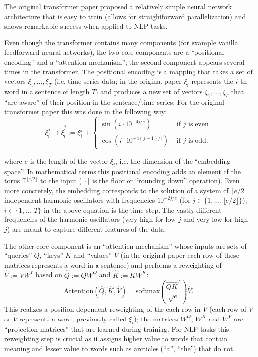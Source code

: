 \documentclass{article}
\begin{document}
The original transformer paper \cite{vaswani2017attention} proposed a relatively simple neural network architecture that is easy to train (allows for straightforward parallelization) and shows remarkable success when applied to NLP tasks. 

Even though the transformer contains many components (for example vanilla feedforward neural networks), the two core components are a ``positional encoding'' and a ``attention mechanism''; the second component appears several times in the transformer.
The positional encoding is a mapping that takes a set of vectors $\xi_1, \ldots, \xi_T$ (i.e. time-series data; in the original paper $\xi_i$ represents the $i$-th word in a sentence of length $T$) and produces a new set of vectors $\tilde{\xi}_1, \ldots, \tilde{\xi}_T$ that ``are aware'' of their position in the sentence/time series.
For the original transformer paper this was done in the following way: 
\begin{equation}
    \xi_i^j \mapsto \tilde{\xi}_i^j := \xi_i^j + \begin{cases} \sin(i\cdot10^{-4j/e}) & \text{ if $j$ is even} \\ \cos(i\cdot10^{-4(j-1)/e}) & \text{ if $j$ is odd}, \end{cases}
    \label{eq:embedding}
\end{equation}

where $e$ is the length of the vector $\xi_i$, i.e. the dimension of the ``embedding space''. 
In mathematical terms this positional encoding adds an element of the torus $\mathbb{T}^{\lfloor{}e/2\rfloor}$ to the input ($\lfloor\cdot\rfloor$ is the floor or ``rounding down'' operation). Even more concretely, the embedding corresponds to the solution of a system of $\lfloor{}e/2\rfloor$ independent harmonic oscillators with frequencies $10^{-2j/e}$ (for $j\in\{1,\ldots,\lfloor{}e/2\rfloor\}$); $i\in\{1,\ldots,T\}$ in the above equation is the time step. The vastly different frequencies of the harmonic oscillators (very high for low $j$ and very low for high $j$) are meant to capture different features of the data. 


The other core component is an ``attention mechanism'' whose inputs are sets of ``queries'' $Q$, ``keys'' $K$ and ``values'' $V$ (in the original paper each row of these matrices represents a word in a sentence) and performs a reweighting of $\hat{V}:= VW^V$ based on $\hat{Q}:=QW^Q$ and $\hat{K}:=KW^K$:
\begin{equation}
    \mathrm{Attention}(\hat{Q},\hat{K},\hat{V}) = \mathrm{softmax}\left(\frac{\hat{Q}\hat{K}^T}{\sqrt{e}}\right)\hat{V}.
    \label{eq:attention}
\end{equation}
This realizes a position-dependent reweighting of the each row in $\hat{V}$ (each row of $V$ or $\hat{V}$ represents a word, previously called $\xi_i$); the matrices $W^Q$, $W^K$ and $W^V$ are ``projection matrices'' that are learned during training. For NLP tasks this reweighting step is crucial as it assigns higher value to words that contain meaning and lesser value to words such as arcticles (``a'', ``the'') that do not. 
\end{document}
